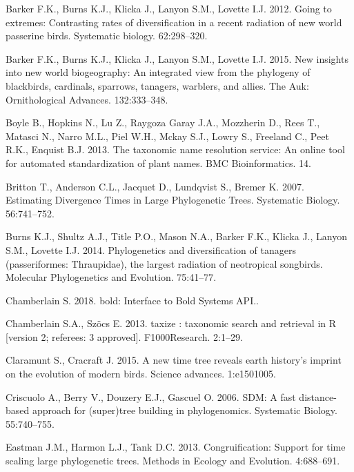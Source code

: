 \documentclass[]{article}
\begin{document}
\leavevmode\hypertarget{ref-barker2012going}{}%
Barker F.K., Burns K.J., Klicka J., Lanyon S.M., Lovette I.J. 2012. Going to extremes: Contrasting rates of diversification in a recent radiation of new world passerine birds. Systematic biology. 62:298--320.

\leavevmode\hypertarget{ref-barker2015new}{}%
Barker F.K., Burns K.J., Klicka J., Lanyon S.M., Lovette I.J. 2015. New insights into new world biogeography: An integrated view from the phylogeny of blackbirds, cardinals, sparrows, tanagers, warblers, and allies. The Auk: Ornithological Advances. 132:333--348.

\leavevmode\hypertarget{ref-Boyle2013}{}%
Boyle B., Hopkins N., Lu Z., Raygoza Garay J.A., Mozzherin D., Rees T., Matasci N., Narro M.L., Piel W.H., Mckay S.J., Lowry S., Freeland C., Peet R.K., Enquist B.J. 2013. The taxonomic name resolution service: An online tool for automated standardization of plant names. BMC Bioinformatics. 14.

\leavevmode\hypertarget{ref-Britton2007}{}%
Britton T., Anderson C.L., Jacquet D., Lundqvist S., Bremer K. 2007. Estimating Divergence Times in Large Phylogenetic Trees. Systematic Biology. 56:741--752.

\leavevmode\hypertarget{ref-burns2014phylogenetics}{}%
Burns K.J., Shultz A.J., Title P.O., Mason N.A., Barker F.K., Klicka J., Lanyon S.M., Lovette I.J. 2014. Phylogenetics and diversification of tanagers (passeriformes: Thraupidae), the largest radiation of neotropical songbirds. Molecular Phylogenetics and Evolution. 75:41--77.

\leavevmode\hypertarget{ref-Chamberlain2018}{}%
Chamberlain S. 2018. bold: Interface to Bold Systems API..

\leavevmode\hypertarget{ref-Chamberlain2013}{}%
Chamberlain S.A., Szöcs E. 2013. taxize : taxonomic search and retrieval in R {[}version 2; referees: 3 approved{]}. F1000Research. 2:1--29.

\leavevmode\hypertarget{ref-claramunt2015new}{}%
Claramunt S., Cracraft J. 2015. A new time tree reveals earth history's imprint on the evolution of modern birds. Science advances. 1:e1501005.

\leavevmode\hypertarget{ref-Criscuolo2006}{}%
Criscuolo A., Berry V., Douzery E.J., Gascuel O. 2006. SDM: A fast distance-based approach for (super)tree building in phylogenomics. Systematic Biology. 55:740--755.

\leavevmode\hypertarget{ref-Eastman2013}{}%
Eastman J.M., Harmon L.J., Tank D.C. 2013. Congruification: Support for time scaling large phylogenetic trees. Methods in Ecology and Evolution. 4:688--691.
\end{document}
